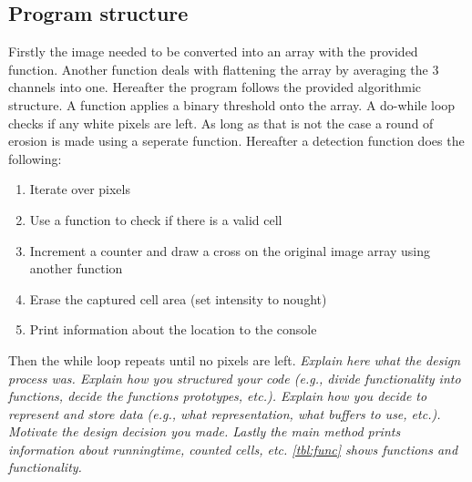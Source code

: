 \documentclass[a4paper, english]{article}
\numberwithin{equation}{section}
\begin{document}
\subsection{Program structure}
Firstly the image needed to be converted into an array with the provided function. Another function deals with flattening the array by averaging the 3 channels into one. Hereafter the program follows the provided algorithmic structure. A function applies a binary threshold onto the array. A do-while loop checks if any white pixels are left. As long as that is not the case a round of erosion is made using a seperate function. Hereafter a detection function does the following:
\begin{enumerate}
    \item Iterate over pixels
    \item Use a function to check if there is a valid cell
    \item Increment a counter and draw a cross on the original image array using another function
    \item Erase the captured cell area (set intensity to nought)
    \item Print information about the location to the console
\end{enumerate}
Then the while loop repeats until no pixels are left.
\textit{Explain here what the design process was. Explain how you structured your code (e.g., divide functionality into functions, decide the functions prototypes, etc.). Explain how you decide to represent and store data (e.g., what representation, what buffers to use, etc.). Motivate the design decision you made.
    Lastly the main method prints information about runningtime, counted cells, etc.
    \cref{tbl:func} shows functions and functionality.}
\end{document}
